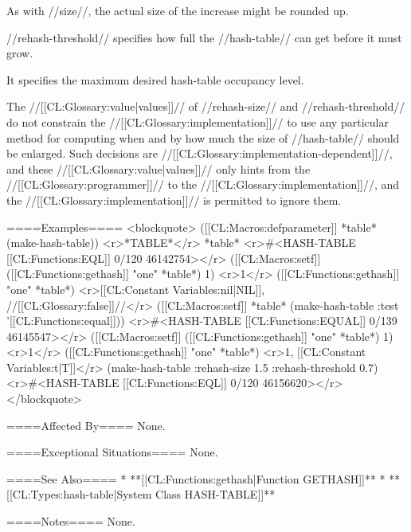 As with //size//, the actual size of the increase might be rounded up.

//rehash-threshold// specifies how full the //hash-table// can get before it must grow.

It specifies the maximum desired hash-table occupancy level.

The //[[CL:Glossary:value|values]]// of //rehash-size// and //rehash-threshold// do not constrain the //[[CL:Glossary:implementation]]// to use any particular method for computing when and by how much the size of //hash-table// should be enlarged. Such decisions are //[[CL:Glossary:implementation-dependent]]//, and these //[[CL:Glossary:value|values]]// only hints from the //[[CL:Glossary:programmer]]// to the //[[CL:Glossary:implementation]]//, and the //[[CL:Glossary:implementation]]// is permitted to ignore them.

====Examples====
<blockquote>
([[CL:Macros:defparameter]] *table* (make-hash-table)) <r>*TABLE*</r> 
*table* <r>#<HASH-TABLE [[CL:Functions:EQL]] 0/120 46142754></r>
([[CL:Macros:setf]] ([[CL:Functions:gethash]] "one" *table*) 1) <r>1</r>
([[CL:Functions:gethash]] "one" *table*) <r>[[CL:Constant Variables:nil|NIL]], //[[CL:Glossary:false]]//</r>
([[CL:Macros:setf]] *table* (make-hash-table :test '[[CL:Functions:equal]])) <r>#<HASH-TABLE [[CL:Functions:EQUAL]] 0/139 46145547></r>
([[CL:Macros:setf]] ([[CL:Functions:gethash]] "one" *table*) 1) <r>1</r>
([[CL:Functions:gethash]] "one" *table*) <r>1, [[CL:Constant Variables:t|T]]</r>
(make-hash-table :rehash-size 1.5 :rehash-threshold 0.7) <r>#<HASH-TABLE [[CL:Functions:EQL]] 0/120 46156620></r>
</blockquote>

====Affected By====
None.

====Exceptional Situations====
None.

====See Also====
  * **[[CL:Functions:gethash|Function GETHASH]]**
  * **[[CL:Types:hash-table|System Class HASH-TABLE]]**

====Notes====
None.

       
